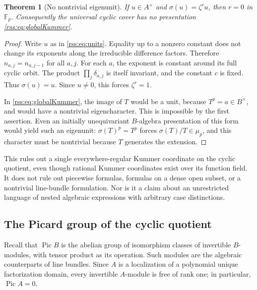 \documentclass[11pt,a4paper]{article}
\newtheorem{theorem}{Theorem}[section]
\theoremstyle{definition}
\theoremstyle{remark}
\newcommand{\F}{\mathbb F}
\newcommand{\Pic}{\operatorname{Pic}}
\begin{document}
\begin{theorem}[No nontrivial eigenunit]\label{rss:thm:eigenunit}
If $u\in A^\times$ and $\sigma(u)=\zeta^r u$, then $r=0$ in $\F_p$.
Consequently the universal cyclic cover has no presentation
\eqref{rss:eq:globalKummer}.
\end{theorem}
\begin{proof}
Write $u$ as in \eqref{rss:eq:units}. Equality up to a nonzero constant does
not change its exponents along the irreducible difference factors.
Therefore $n_{a,j}=n_{a,j-1}$ for all $a,j$. For each $a$, the exponent is
constant around its full cyclic orbit. The product
$\prod_j\delta_{a,j}$ is itself invariant, and the constant $c$ is fixed.
Thus $\sigma(u)=u$. Since $u\neq0$, this forces $\zeta^r=1$.

In \eqref{rss:eq:globalKummer}, the image of $T$ would be a unit, because
$T^p=a\in B^\times$, and would have a nontrivial eigencharacter. This is
impossible by the first assertion. Even an initially unequivariant
$B$-algebra presentation of this form would yield such an eigenunit:
$\sigma(T)^p=T^p$ forces $\sigma(T)/T\in\mu_p$, and this character
must be nontrivial because $T$ generates the extension.
\end{proof}

This rules out a single everywhere-regular Kummer coordinate on the
cyclic quotient, even though rational Kummer coordinates exist over its
function field. It does not rule out piecewise formulas, formulas on a
dense open subset, or a nontrivial line-bundle formulation. Nor is it a
claim about an unrestricted language of nested algebraic expressions with
arbitrary case distinctions.

\subsection{The Picard group of the cyclic quotient}

Recall that $\Pic B$ is the abelian group of isomorphism classes of
invertible $B$-modules, with tensor product as its operation. Such modules
are the algebraic counterparts of line bundles. Since $A$ is a localization
of a polynomial unique factorization domain, every invertible $A$-module
is free of rank one; in particular, $\Pic A=0$.
\end{document}
